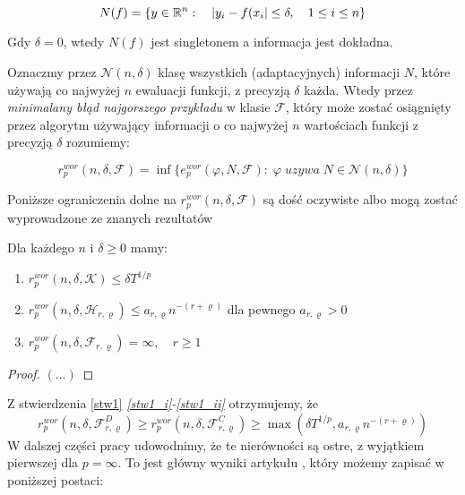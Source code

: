 \documentclass[oik, pdftex, robocza, man]{mgrwms}
\begin{document}
\begin{equation*}
    N(f) = \{y \in \mathbb{R}^{n} : \quad |y_{i} - f(x_{i}| \leq \delta, \quad 1 \leq i \leq n\}
\end{equation*}

\noindent
Gdy $\delta = 0$, wtedy $N(f)$ jest singletonem a informacja jest dokładna.

Oznaczmy przez $\mathcal{N}(n, \delta)$ klasę wszystkich (adaptacyjnych) informacji $N$, które używają co najwyżej $n$ ewaluacji funkcji, z precyzją $\delta$ każda. Wtedy przez \textit{minimalany błąd najgorszego przykładu} w klasie $\mathcal{F}$, który może zostać osiągnięty przez algorytm używający informacji o co najwyżej $n$ wartościach funkcji z precyzją $\delta$ rozumiemy:

\begin{equation*}
    r^{wor}_{p}(n, \delta, \mathcal{F}) = \inf\{ e^{wor}_{p}(\varphi, N, \mathcal{F}) : \; \varphi \; uzywa \; N \in \mathcal{N}(n, \delta) \}
\end{equation*}

Poniższe ograniczenia dolne na $r^{wor}_{p}(n, \delta, \mathcal{F})$ są dość oczywiste albo mogą zostać wyprowadzone ze znanych rezultatów

\begin{stw}
\label{stw1}
    Dla każdego $n$ i $\delta \geq 0$ mamy:
    \begin{enumerate}[label=(\roman*)]
        \item \label{stw1_i} $r^{wor}_{p}(n, \delta, \mathcal{K}) \leq \delta T^{1/p}$
        \item \label{stw1_ii} $r^{wor}_{p}(n, \delta, \mathcal{H}_{r,\varrho}) \leq a_{r,\varrho}n^{-(r + \varrho)}$ dla pewnego $a_{r,\varrho} > 0$
        \item \label{stw1_iii} $r^{wor}_{p}(n, \delta, \mathcal{F}_{r,\varrho}) = \infty, \quad r \geq 1$
    \end{enumerate}
\end{stw}
\begin{proof}
    $(\dots)$
\end{proof}

Z stwierdzenia \ref{stw1} \textit{\ref{stw1_i}-\ref{stw1_ii}} otrzymujemy, że 
\begin{equation*}
    r^{wor}_{p}(n, \delta, \mathcal{F}^{D}_{r,\varrho}) \geq r^{wor}_{p}(n, \delta, \mathcal{F}^{C}_{r,\varrho}) \geq \max(\delta T^{1/p}, a_{r,\varrho} n^{-(r+\varrho)})
\end{equation*}
W dalszej części pracy udowodnimy, że te nierówności są ostre, z wyjątkiem pierwszej dla $p=\infty$. To jest główny wyniki artykułu \cite{AoP}, który możemy zapisać w poniższej postaci:
\end{document}
